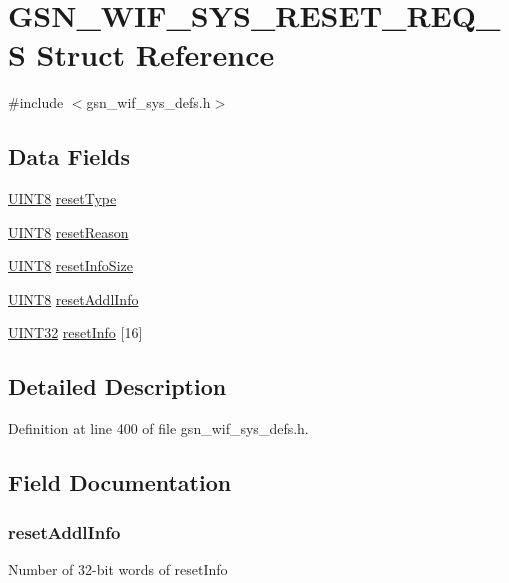 \hypertarget{a00362}{
\section{GSN\_\-WIF\_\-SYS\_\-RESET\_\-REQ\_\-S Struct Reference}
\label{a00362}
}


{\ttfamily \#include $<$gsn\_\-wif\_\-sys\_\-defs.h$>$}

\subsection*{Data Fields}
\begin{DoxyCompactItemize}
\item 
\hyperlink{a00660_gab27e9918b538ce9d8ca692479b375b6a}{UINT8} \hyperlink{a00362_a424379d8fb70c92b5ebe7450172ed356}{resetType}
\item 
\hyperlink{a00660_gab27e9918b538ce9d8ca692479b375b6a}{UINT8} \hyperlink{a00362_a860e10ca47301c26f0cc214d9aaa74b9}{resetReason}
\item 
\hyperlink{a00660_gab27e9918b538ce9d8ca692479b375b6a}{UINT8} \hyperlink{a00362_af784980100bfb4e57308fee9850b394b}{resetInfoSize}
\item 
\hyperlink{a00660_gab27e9918b538ce9d8ca692479b375b6a}{UINT8} \hyperlink{a00362_a4f1bb86c841d8dfc393b4d39190d81e1}{resetAddlInfo}
\item 
\hyperlink{a00660_gae1e6edbbc26d6fbc71a90190d0266018}{UINT32} \hyperlink{a00362_ab5521c89f8f524c9a3e9fa8e6591b9f8}{resetInfo} \mbox{[}16\mbox{]}
\end{DoxyCompactItemize}


\subsection{Detailed Description}


Definition at line 400 of file gsn\_\-wif\_\-sys\_\-defs.h.



\subsection{Field Documentation}
\hypertarget{a00362_a4f1bb86c841d8dfc393b4d39190d81e1}{
\subsubsection[{resetAddlInfo}]{ {\bf resetAddlInfo}}}
\label{a00362_a4f1bb86c841d8dfc393b4d39190d81e1}
Number of 32-\/bit words of resetInfo 

